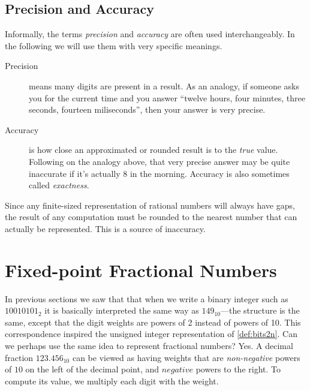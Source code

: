 \subsection{Precision and Accuracy}

Informally, the terms \emph{precision} and \emph{accuracy} are often
used interchangeably.  In the following we will use them with very
specific meanings.

\begin{description}
\item[Precision] means many digits are present in a result.  As an
  analogy, if someone asks you for the current time and you answer
  ``twelve hours, four minutes, three seconds, fourteen miliseconds'',
  then your answer is very precise.
\item[Accuracy] is how close an approximated or rounded result is to
  the \emph{true} value.  Following on the analogy above, that very
  precise answer may be quite inaccurate if it's actually 8 in the
  morning.  Accuracy is also sometimes called \emph{exactness}.
\end{description}

Since any finite-sized representation of rational numbers will always
have gaps, the result of any computation must be rounded to the
nearest number that can actually be represented.  This is a source of
inaccuracy.

\section{Fixed-point Fractional Numbers}

In previous sections we saw that that when we write a binary integer
such as $10010101_{2}$ it is basically interpreted the same way as
$149_{10}$---the structure is the same, except that the digit weights
are powers of 2 instead of powers of 10.  This correspondence inspired
the unsigned integer representation of \cref{def:bits2n}.  Can we
perhaps use the same idea to represent fractional numbers?  Yes.  A
decimal fraction $123.456_{10}$ can be viewed as having weights that
are \emph{non-negative} powers of $10$ on the left of the decimal
point, and $negative$ powers to the right.  To compute its value, we
multiply each digit with the weight.


